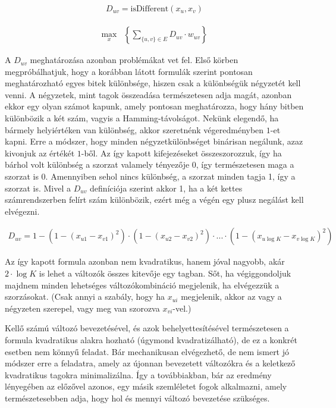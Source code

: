 \begin{align}
D_{uv} = \text{isDifferent}(x_u,x_v)
\end{align}

\begin{align} 
	\max_{x} & \left\{\sum _{\{u,v\} \in E } D_{uv} \cdot w_{uv} \right\} 
\end{align}

A $D_{uv}$ meghatározása azonban problémákat vet fel. Első körben megpróbálhatjuk, hogy a korábban látott formulák szerint pontosan meghatározható egyes bitek különbsége, hiszen csak a különbségük négyzetét kell venni. A négyzetek, mint tagok összeadása természetesen adja magát, azonban ekkor egy olyan számot kapunk, amely pontosan meghatározza, hogy hány bitben különbözik a két szám, vagyis a Hamming-távolságot. Nekünk elegendő, ha bármely helyiértéken van különbség, akkor szeretnénk végeredményben $1$-et kapni. Erre a módszer, hogy minden négyzetkülönbséget binárisan negálunk, azaz kivonjuk az értékét $1$-ből. Az így kapott kifejezéseket összeszorozzuk, így ha bárhol volt különbség a szorzat valamely tényezője 0, így természetesen maga a szorzat is 0. Amennyiben sehol nincs különbség, a szorzat minden tagja 1, így a szorzat is. Mivel a $D_{uv}$ definíciója szerint akkor 1, ha a két kettes számrendszerben felírt szám különbözik, ezért még a végén egy plusz negálást kell elvégezni.

\begin{align}	
	D_{uv} = 1-  \left( 1-(x_{u1}-x_{v1})^2 \right) \cdot \left( 1-(x_{u2}-x_{v2})^2 \right) \cdot ...  \cdot \left( 1-(x_{u\log K}-x_{v \log K})^2 \right) 
\end{align}

Az így kapott formula azonban nem kvadratikus, hanem jóval nagyobb, akár $2 \cdot \log K$ is lehet a változók összes kitevője egy tagban. Sőt, ha végiggondoljuk majdnem minden lehetséges változókombináció megjelenik, ha elvégezzük a szorzásokat. (Csak annyi a szabály, hogy ha $x_{ui}$ megjelenik, akkor az vagy a négyzeten szerepel, vagy meg van szorozva $x_{vi}$-vel.)

Kellő számú változó bevezetésével, és azok behelyettesítésével természetesen a formula kvadratikus alakra hozható (úgymond kvadratizálható), de ez a konkrét esetben nem könnyű feladat. Bár mechanikusan elvégezhető, de nem ismert jó módszer erre a feladatra, amely az újonnan bevezetett változókra és a keletkező kvadratikus tagokra minimalizálna. Így a továbbiakban, bár az eredmény lényegében az előzővel azonos, egy másik szemléletet fogok alkalmazni, amely természetesebben adja, hogy hol és mennyi változó bevezetése szükséges.





